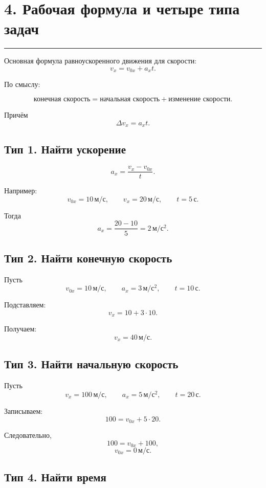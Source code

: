 \documentclass[a4paper,12pt]{article}
\newcommand{\sectionline}{%
  \par\vspace{-0.5em}%
  \noindent\textcolor{accent}{\rule{\linewidth}{0.7pt}}%
  \par\vspace{0.5em}%
}
\begin{document}
\section*{4. Рабочая формула и четыре типа задач}
\sectionline

Основная формула равноускоренного движения для скорости:
\[
  \boxed{v_x=v_{0x}+a_xt}.
\]

По смыслу:

\[
\text{конечная скорость}
=
\text{начальная скорость}
+
\text{изменение скорости}.
\]

Причём
\[
  \Delta v_x=a_xt.
\]

\subsection*{Тип 1. Найти ускорение}

\[
  a_x=\frac{v_x-v_{0x}}{t}.
\]

Например:
\[
  v_{0x}=10\,\text{м}/\text{с},
  \qquad
  v_x=20\,\text{м}/\text{с},
  \qquad
  t=5\,\text{с}.
\]

Тогда
\[
  a_x=
  \frac{20-10}{5}
  =
  2\,\text{м}/\text{с}^2.
\]

\subsection*{Тип 2. Найти конечную скорость}

Пусть
\[
  v_{0x}=10\,\text{м}/\text{с},
  \qquad
  a_x=3\,\text{м}/\text{с}^2,
  \qquad
  t=10\,\text{с}.
\]

Подставляем:
\[
  v_x=10+3\cdot10.
\]

Получаем:
\[
  v_x=40\,\text{м}/\text{с}.
\]

\subsection*{Тип 3. Найти начальную скорость}

Пусть
\[
  v_x=100\,\text{м}/\text{с},
  \qquad
  a_x=5\,\text{м}/\text{с}^2,
  \qquad
  t=20\,\text{с}.
\]

Записываем:
\[
  100=v_{0x}+5\cdot20.
\]

Следовательно,
\[
  100=v_{0x}+100,
\]
\[
  v_{0x}=0\,\text{м}/\text{с}.
\]

\subsection*{Тип 4. Найти время}
\end{document}
